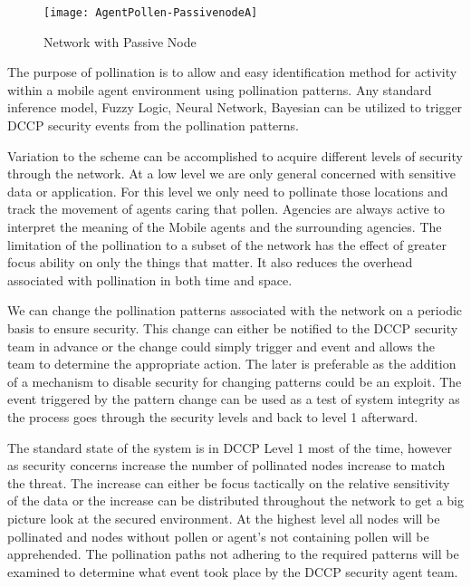 \documentclass{acm_proc_article-sp}
\begin{document}
\begin{figure}
\centering
\texttt{[image: AgentPollen-PassivenodeA]}
\caption{Network with Passive Node}
\end{figure}

The purpose of pollination is to allow and easy identification method for activity within a mobile agent environment using pollination patterns. Any standard inference model, Fuzzy Logic, Neural Network, Bayesian can be utilized to trigger DCCP security events from the pollination patterns.

Variation to the scheme can be accomplished to acquire different levels of security through the network. At a low level we are only general concerned with sensitive data or application. For this level we only need to pollinate those locations and track the movement of agents caring that pollen. Agencies are always active to interpret the meaning of the Mobile agents and the surrounding agencies. The limitation of the pollination to a subset of the network has the effect of greater focus ability on only the things that matter. It also reduces the overhead associated with pollination in both time and space.

We can change the pollination patterns associated with the network on a periodic basis to ensure security. This change can either be notified to the DCCP security team in advance or the change could simply trigger and event and allows the team to determine the appropriate action. The later is preferable as the addition of a mechanism to disable security for changing patterns could be an exploit. The event triggered by the pattern change can be used as a test of system integrity as the process goes through the security levels and back to level 1 afterward.

The standard state of the system is in DCCP Level 1 most of the time, however as security concerns increase the number of pollinated nodes increase to match the threat. The increase can either be focus tactically on the relative sensitivity of the data or the increase can be distributed throughout the network to get a big picture look at the secured environment. At the highest level all nodes will be pollinated and nodes without pollen or agent's not containing pollen will be apprehended. The pollination paths not adhering to the required patterns will be examined to determine what event took place by the DCCP security agent team.
\end{document}
